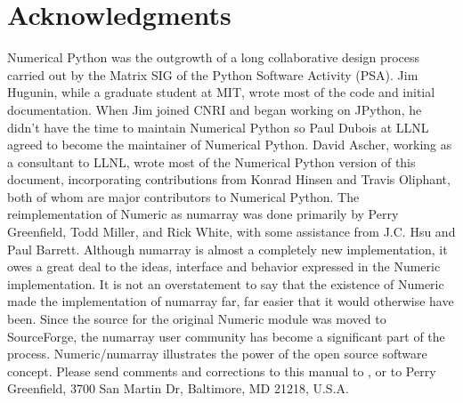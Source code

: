 \section{Acknowledgments}

Numerical Python was the outgrowth of a long collaborative design process
carried out by the Matrix SIG of the Python Software Activity (PSA). Jim
Hugunin, while a graduate student at MIT, wrote most of the code and initial
documentation. When Jim joined CNRI and began working on JPython, he didn't
have the time to maintain Numerical Python so Paul Dubois at LLNL agreed to
become the maintainer of Numerical Python. David Ascher, working as a
consultant to LLNL, wrote most of the Numerical Python version of this
document, incorporating contributions from Konrad Hinsen and Travis Oliphant,
both of whom are major contributors to Numerical Python.  The reimplementation
of Numeric as numarray was done primarily by Perry Greenfield, Todd Miller, and
Rick White, with some assistance from J.C. Hsu and Paul Barrett. Although
numarray is almost a completely new implementation, it owes a great deal to the
ideas, interface and behavior expressed in the Numeric implementation. It is
not an overstatement to say that the existence of Numeric made the
implementation of numarray far, far easier that it would otherwise have been.
Since the source for the original Numeric module was moved to SourceForge, the
numarray user community has become a significant part of the process.
Numeric/numarray illustrates the power of the open source software concept.
Please send comments and corrections to this manual to
, or to Perry Greenfield, 3700
San Martin Dr, Baltimore, MD 21218, U.S.A.




